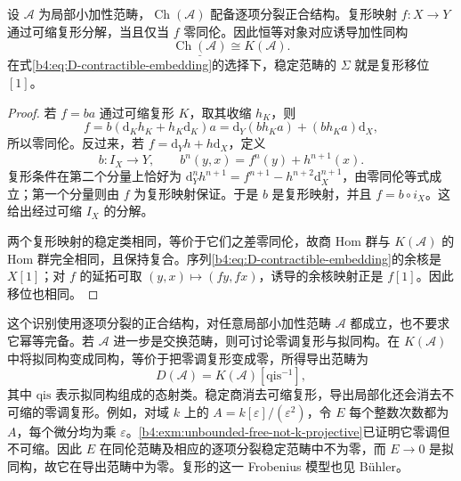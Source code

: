 \begin{theorem}\label{b4:thm:D-stable-complex-homotopy}
	设 \(\mathcal A\) 为局部小加性范畴，\(\operatorname{Ch}(\mathcal A)\) 配备逐项分裂正合结构。复形映射 \(f:X\to Y\) 通过可缩复形分解，当且仅当 \(f\) 零同伦。因此恒等对象对应诱导加性同构
	\[
		\underline{\operatorname{Ch}(\mathcal A)}\cong K(\mathcal A).
	\]
	在式\eqref{b4:eq:D-contractible-embedding}的选择下，稳定范畴的 \(\Sigma\) 就是复形移位 \([1]\)。
\end{theorem}
\begin{proof}
	若 \(f=ba\) 通过可缩复形 \(K\)，取其收缩 \(h_K\)，则
	\[
		f=b(\mathrm{d}_Kh_K+h_K\mathrm{d}_K)a =\mathrm{d}_Y(bh_Ka)+(bh_Ka)\mathrm{d}_X,
	\]
	所以零同伦。反过来，若 \(f=\mathrm{d}_Yh+h\mathrm{d}_X\)，定义
	\[
		b:I_X\longrightarrow Y, \qquad b^n(y,x)=f^n(y)+h^{n+1}(x).
	\]
	复形条件在第二个分量上恰好为 \(\mathrm{d}_Y^nh^{n+1}=f^{n+1}-h^{n+2}\mathrm{d}_X^{n+1}\)，由零同伦等式成立；第一个分量则由 \(f\) 为复形映射保证。于是 \(b\) 是复形映射，并且 \(f=b\circ i_X\)。这给出经过可缩 \(I_X\) 的分解。

	两个复形映射的稳定类相同，等价于它们之差零同伦，故商 Hom 群与 \(K(\mathcal A)\) 的 Hom 群完全相同，且保持复合。序列\eqref{b4:eq:D-contractible-embedding}的余核是 \(X[1]\)；对 \(f\) 的延拓可取 \((y,x)\mapsto(fy,fx)\)，诱导的余核映射正是 \(f[1]\)。因此移位也相同。
\end{proof}

这个识别使用逐项分裂的正合结构，对任意局部小加性范畴 \(\mathcal A\) 都成立，也不要求它幂等完备。若 \(\mathcal A\) 进一步是交换范畴，则可讨论零调复形与拟同构。在 \(K(\mathcal A)\) 中将拟同构变成同构，等价于把零调复形变成零，所得导出范畴为
\[
	D(\mathcal A)=K(\mathcal A)[\mathrm{qis}^{-1}],
\]
其中 \(\mathrm{qis}\) 表示拟同构组成的态射类。稳定商消去可缩复形，导出局部化还会消去不可缩的零调复形。例如，对域 \(k\) 上的 \(A=k[\varepsilon]/(\varepsilon^2)\)，令 \(E\) 每个整数次数都为 \(A\)，每个微分均为乘 \(\varepsilon\)。\cref{b4:exm:unbounded-free-not-k-projective}已证明它零调但不可缩。因此 \(E\) 在同伦范畴及相应的逐项分裂稳定范畴中不为零，而 \(E\to0\) 是拟同构，故它在导出范畴中为零。复形的这一 Frobenius 模型也见 Bühler\cite[Section 13.4, Example 13.8]{Buehler2010ExactCategories}。

